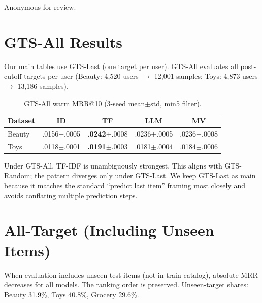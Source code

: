 \documentclass[sigconf,natbib=true,anonymous]{acmart}
\begin{document}
\begin{acks}
Anonymous for review.
\end{acks}




\appendix

\section{GTS-All Results}
\label{app:gts-all}

Our main tables use GTS-Last (one target per user).  GTS-All evaluates all post-cutoff targets per user (Beauty: 4{,}520 users $\to$ 12{,}001 samples; Toys: 4{,}873 users $\to$ 13{,}186 samples).

\begin{table}[h]
\centering
\caption{GTS-All warm MRR@10 (3-seed mean$\pm$std, min5 filter).}
\label{tab:gts-all}
\small
\begin{tabular}{@{}lcccc@{}}
\toprule
Dataset & ID & TF & LLM & MV \\
\midrule
Beauty & .0156\tiny{$\pm$.0005} & \textbf{.0242}\tiny{$\pm$.0008} & .0236\tiny{$\pm$.0005} & .0236\tiny{$\pm$.0008} \\
Toys   & .0118\tiny{$\pm$.0001} & \textbf{.0191}\tiny{$\pm$.0003} & .0181\tiny{$\pm$.0004} & .0184\tiny{$\pm$.0006} \\
\bottomrule
\end{tabular}
\end{table}

Under GTS-All, TF-IDF is unambiguously strongest.  This aligns with GTS-Random; the pattern diverges only under GTS-Last.  We keep GTS-Last as main because it matches the standard ``predict last item'' framing most closely and avoids conflating multiple prediction steps.

\section{All-Target (Including Unseen Items)}
\label{app:alltarget}

When evaluation includes unseen test items (not in train catalog), absolute MRR decreases for all models.  The ranking order is preserved.  Unseen-target shares: Beauty 31.9\%, Toys 40.8\%, Grocery 29.6\%.
\end{document}
